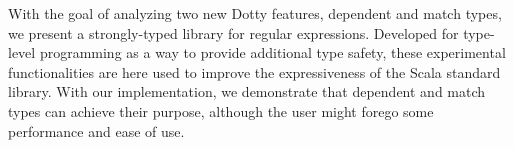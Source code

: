 With the goal of analyzing two new Dotty features, dependent and match types, we present a strongly-typed library for regular expressions. Developed for type-level programming as a way to provide additional type safety, these experimental functionalities are here used to improve the expressiveness of the Scala standard library. With our implementation, we demonstrate that dependent and match types can achieve their purpose, although the user might forego some performance and ease of use.